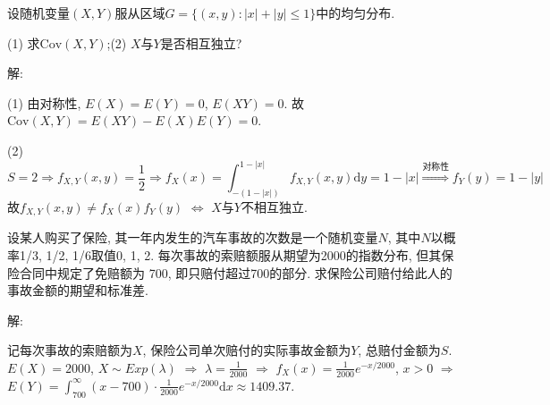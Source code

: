 \documentclass[standard]{ExBook}
\begin{document}
\begin{qitems}
\vspace{-5em}

    \begin{bbox}
    \begin{shaded}
        \qitem
设随机变量$(X,Y)$服从区域$G=\{(x,y):|x|+|y|\leq 1\}$中的均匀分布.

(1) 求$\mathrm{Cov}(X,Y)$;\qquad (2) $X$与$Y$是否相互独立?
    \end{shaded}
    \end{bbox}

\vspace{-5em}

    \begin{bbox}
解: 

(1) 由对称性, $E(X)=E(Y)=0$, $E(XY)=0$. 故$\mathrm{Cov}(X,Y)=E(XY)-E(X)E(Y)=0$.

(2)
$$\displaystyle S=2 \Longrightarrow f_{X,Y}(x,y)=\frac{1}{2} \Longrightarrow f_{X}(x)=\int_{-(1-|x|)}^{1-|x|}f_{X,Y}(x,y)\mathrm{d}y=1-|x| \overset{\text{对称性}}{\Longrightarrow} f_{Y}(y)=1-|y|$$
故$f_{X,Y}(x,y)\neq f_{X}(x)f_{Y}(y)$ $\Longleftrightarrow$ $X$与$Y$不相互独立.
    \end{bbox}

\vspace{-5em}

    \begin{bbox}
    \begin{shaded}
        \qitem
设某人购买了保险, 其一年内发生的汽车事故的次数是一个随机变量$N$, 其中$N$以概率1/3, 1/2, 1/6取值0, 1, 2. 每次事故的索赔额服从期望为2000的指数分布, 但其保险合同中规定了免赔额为 700, 即只赔付超过700的部分. 求保险公司赔付给此人的事故金额的期望和标准差.
    \end{shaded}
    \end{bbox}

\vspace{-5em}

    \begin{bbox}
解: 

记每次事故的索赔额为$X$, 保险公司单次赔付的实际事故金额为$Y$, 总赔付金额为$S$. $E(X)=2000$, $X\sim Exp(\lambda)$ $\Longrightarrow$ $\lambda=\displaystyle\frac{1}{2000}$ $\Longrightarrow$ $f_{X}(x)=\displaystyle\frac{1}{2000}e^{-x/2000}$, $x>0$ $\Longrightarrow$ $\displaystyle E(Y)=\int_{700}^{\infty}(x-700)\cdot \frac{1}{2000}e^{-x/2000}\mathrm{d}x\approx1409.37$.
    \end{bbox}

\vspace{-5em}


\end{qitems}
\end{document}
